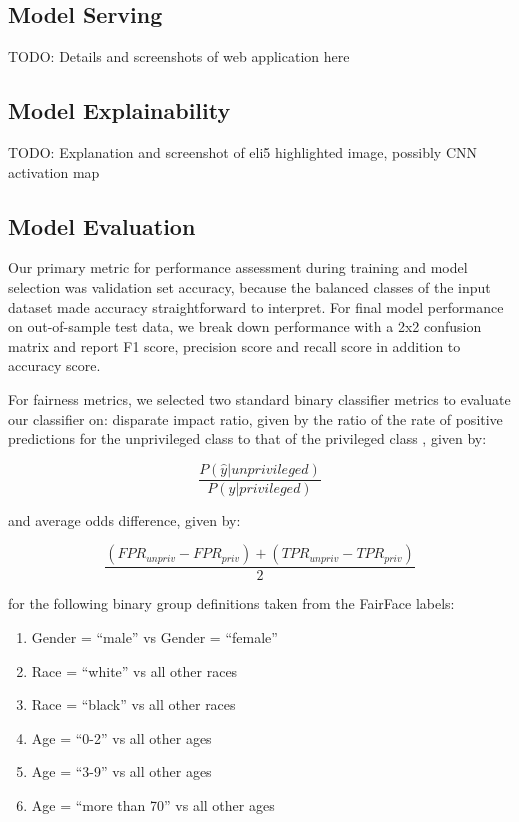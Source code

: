 \documentclass[11pt, letterpaper]{article}
\providecommand{\tightlist}{%
  \setlength{\itemsep}{0pt}\setlength{\parskip}{0pt}
}
\begin{document}
\begin{multicols}{2}
  \subsection{Model Serving}

  TODO: Details and screenshots of web application here

  \subsection{Model Explainability}

  TODO: Explanation and screenshot of eli5 highlighted image, possibly CNN
  activation map

  \subsection{Model Evaluation}

  Our primary metric for performance assessment during training and
  model selection was validation set accuracy, because the balanced
  classes of the input dataset made accuracy straightforward to
  interpret. For final model performance on out-of-sample test data,
  we break down performance with a 2x2 confusion matrix and report F1
  score, precision score and recall score in addition to accuracy
  score.

  For fairness metrics, we selected two standard binary classifier
  metrics to evaluate our classifier on: disparate impact ratio, given
  by the ratio of the rate of positive predictions for the
  unprivileged class to that of the privileged class
  \cite{fairMLHealth}, given by:

  $$\frac{P(\hat{y}|unprivileged)}{P(\hat{y}|privileged)}$$

  and average odds difference, given by:

  $$\frac{(FPR_{unpriv} - FPR_{priv}) + (TPR_{unpriv} - TPR_{priv})}{2}$$

  for the following binary group definitions taken from the FairFace
  labels:

  \begin{enumerate}
    \tightlist
  \item Gender = ``male'' vs Gender = ``female''
  \item Race = ``white'' vs all other races
  \item Race = ``black'' vs all other races
  \item Age = ``0-2'' vs all other ages
  \item Age = ``3-9'' vs all other ages
  \item Age = ``more than 70'' vs all other ages
  \end{enumerate}


\end{multicols}
\end{document}
